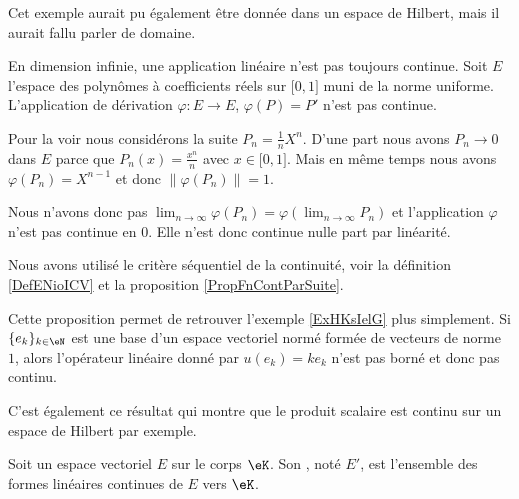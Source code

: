 Cet exemple aurait pu également être donnée dans un espace de Hilbert, mais il aurait fallu parler de domaine.


\begin{example}      \label{EXooDMVJooAJywMU}
    En dimension infinie, une application linéaire n'est pas toujours continue. Soit \( E\) l'espace des polynômes à coefficients réels sur \( \mathopen[ 0 , 1 \mathclose]\) muni de la norme uniforme. L'application de dérivation \( \varphi\colon E\to E\), \( \varphi(P)=P'\) n'est pas continue.

    Pour la voir nous considérons la suite \( P_n=\frac{1}{ n }X^n\). D'une part nous avons \( P_n\to 0\) dans \( E\) parce que \( P_n(x)=\frac{ x^n }{ n }\) avec \( x\in \mathopen[ 0 , 1 \mathclose]\). Mais en même temps nous avons \( \varphi(P_n)=X^{n-1}\) et donc \( \| \varphi(P_n) \|=1\).

    Nous n'avons donc pas \( \lim_{n\to \infty} \varphi(P_n)=\varphi(\lim_{n\to \infty} P_n)\) et l'application \( \varphi\) n'est pas continue en \( 0\). Elle n'est donc continue nulle part par linéarité.

    Nous avons utilisé le critère séquentiel de la continuité, voir la définition \ref{DefENioICV} et la proposition \ref{PropFnContParSuite}.
\end{example}

\begin{remark}  \label{RemOAXNooSMTDuN}
Cette proposition permet de retrouver l'exemple \ref{ExHKsIelG} plus simplement. Si \( \{ e_k \}_{k\in \eN}\) est une base d'un espace vectoriel normé formée de vecteurs de norme \( 1\), alors l'opérateur linéaire donné par \( u(e_k)=ke_k\) n'est pas borné et donc pas continu.
\end{remark}

C'est également ce résultat qui montre que le produit scalaire est continu sur un espace de Hilbert par exemple.

\begin{definition}      \label{DEFooKSDFooGIBtrG}
    Soit un espace vectoriel \( E\) sur le corps \( \eK\). Son , noté \( E'\), est l'ensemble des formes linéaires continues de \( E\) vers \( \eK\).
\end{definition}


